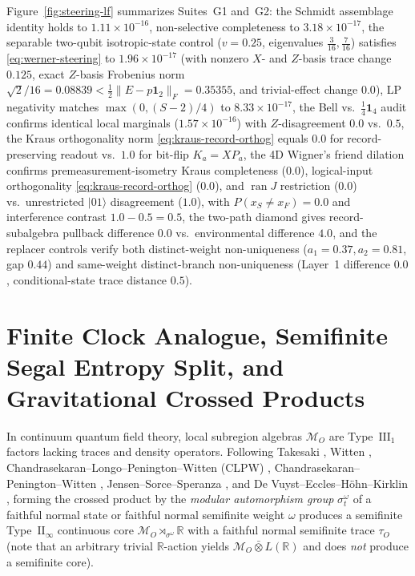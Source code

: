 \documentclass[11pt,a4paper]{article}
\theoremstyle{definition}
\theoremstyle{remark}
\newcommand{\cM}{\mathcal{M}}
\newcommand{\bbR}{\mathbb{R}}
\newcommand{\1}{\mathbf{1}}
\begin{document}
Figure~\ref{fig:steering-lf} summarizes Suites~G1 and~G2: the Schmidt assemblage identity holds to $1.11\times 10^{-16}$, non-selective completeness to $3.18\times 10^{-17}$, the separable two-qubit isotropic-state control ($v=0.25$, eigenvalues $\frac{3}{16},\frac{7}{16}$) satisfies \eqref{eq:werner-steering} to $1.96\times 10^{-17}$ (with nonzero $X$- and $Z$-basis trace change $0.125$, exact $Z$-basis Frobenius norm $\sqrt{2}/16=0.08839 < \frac{1}{2}\|E-p\1_2\|_F=0.35355$, and trivial-effect change $0.0$), LP negativity matches $\max(0,(S-2)/4)$ to $8.33\times 10^{-17}$, the Bell vs.\ $\frac{1}{4}\1_4$ audit confirms identical local marginals ($1.57\times 10^{-16}$) with $Z$-disagreement $0.0$ vs.\ $0.5$, the Kraus orthogonality norm \eqref{eq:kraus-record-orthog} equals $0.0$ for record-preserving readout vs.\ $1.0$ for bit-flip $K_a=X P_a$, the 4D Wigner's friend dilation confirms premeasurement-isometry Kraus completeness ($0.0$), logical-input orthogonality \eqref{eq:kraus-record-orthog} ($0.0$), and $\operatorname{ran}J$ restriction ($0.0$) vs.\ unrestricted $|01\rangle$ disagreement ($1.0$), with $P(x_S\neq x_F)=0.0$ and interference contrast $1.0 - 0.5 = 0.5$, the two-path diamond gives record-subalgebra pullback difference $0.0$ vs.\ environmental difference $4.0$, and the replacer controls verify both distinct-weight non-uniqueness ($a_1=0.37,a_2=0.81$, gap $0.44$) and same-weight distinct-branch non-uniqueness (Layer~1 difference $0.0$, conditional-state trace distance $0.5$).

\section{Finite Clock Analogue, Semifinite Segal Entropy Split, and Gravitational Crossed Products}\label{sec:type2}

In continuum quantum field theory, local subregion algebras $\cM_O$ are Type~$\mathrm{III}_1$ factors lacking traces and density operators. Following Takesaki \cite{Takesaki1973}, Witten \cite{Witten2022}, Chandrasekaran--Longo--Penington--Witten (CLPW) \cite{CLPW2023}, Chandrasekaran--Penington--Witten \cite{CPW2023}, Jensen--Sorce--Speranza \cite{JensenSorceSperanza2023}, and De Vuyst--Eccles--H\"ohn--Kirklin \cite{DeVuyst2024,DeVuyst2025}, forming the crossed product by the \emph{modular automorphism group} $\sigma^\omega_t$ of a faithful normal state or faithful normal semifinite weight $\omega$ produces a semifinite Type~$\mathrm{II}_\infty$ continuous core $\cM_O\rtimes_{\sigma^\omega}\bbR$ with a faithful normal semifinite trace $\tau_O$ (note that an arbitrary trivial $\bbR$-action yields $\cM_O\bar{\otimes}L(\bbR)$ and does \emph{not} produce a semifinite core).
\end{document}
